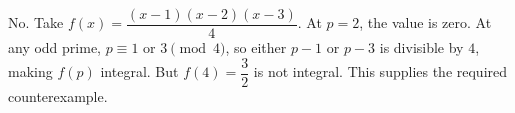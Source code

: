 No. Take $f(x)=\dfrac{(x-1)(x-2)(x-3)}{4}$. At $p=2$, the value is zero. At any odd prime, $p\equiv1$ or $3\pmod4$, so either $p-1$ or $p-3$ is divisible by $4$, making $f(p)$ integral. But $f(4)=\dfrac{3}{2}$ is not integral. This supplies the required counterexample.
